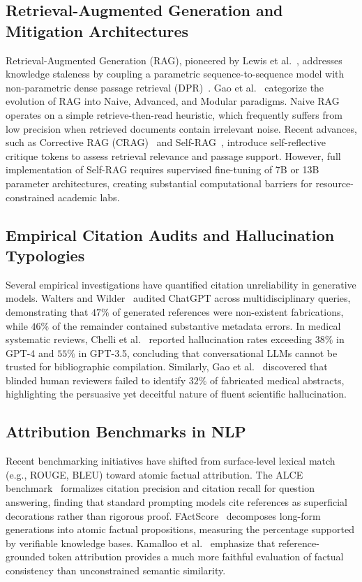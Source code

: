 \documentclass[acmsmall,screen]{acmart}
\begin{document}
\subsection{Retrieval-Augmented Generation and Mitigation Architectures}
Retrieval-Augmented Generation (RAG), pioneered by Lewis et al.~\cite{lewis2020rag}, addresses knowledge staleness by coupling a parametric sequence-to-sequence model with non-parametric dense passage retrieval (DPR)~\cite{karpukhin2020dpr}. Gao et al.~\cite{gao2023rag} categorize the evolution of RAG into Naive, Advanced, and Modular paradigms. Naive RAG operates on a simple retrieve-then-read heuristic, which frequently suffers from low precision when retrieved documents contain irrelevant noise. Recent advances, such as Corrective RAG (CRAG)~\cite{yan2024crag} and Self-RAG~\cite{asai2024selfrag}, introduce self-reflective critique tokens to assess retrieval relevance and passage support. However, full implementation of Self-RAG requires supervised fine-tuning of 7B or 13B parameter architectures, creating substantial computational barriers for resource-constrained academic labs.

\subsection{Empirical Citation Audits and Hallucination Typologies}
Several empirical investigations have quantified citation unreliability in generative models. Walters and Wilder~\cite{walters2023} audited ChatGPT across multidisciplinary queries, demonstrating that $47\%$ of generated references were non-existent fabrications, while $46\%$ of the remainder contained substantive metadata errors. In medical systematic reviews, Chelli et al.~\cite{chelli2024} reported hallucination rates exceeding $38\%$ in GPT-4 and $55\%$ in GPT-3.5, concluding that conversational LLMs cannot be trusted for bibliographic compilation. Similarly, Gao et al.~\cite{gao2023abstracts} discovered that blinded human reviewers failed to identify $32\%$ of fabricated medical abstracts, highlighting the persuasive yet deceitful nature of fluent scientific hallucination.

\subsection{Attribution Benchmarks in NLP}
Recent benchmarking initiatives have shifted from surface-level lexical match (e.g., ROUGE, BLEU) toward atomic factual attribution. The ALCE benchmark~\cite{gao2023alce} formalizes citation precision and citation recall for question answering, finding that standard prompting models cite references as superficial decorations rather than rigorous proof. FActScore~\cite{min2023factscore} decomposes long-form generations into atomic factual propositions, measuring the percentage supported by verifiable knowledge bases. Kamalloo et al.~\cite{kamalloo2023eval} emphasize that reference-grounded token attribution provides a much more faithful evaluation of factual consistency than unconstrained semantic similarity.
\end{document}
